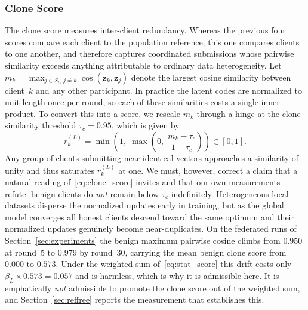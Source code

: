 \documentclass[journal]{IEEEtran}
\begin{document}
\subsubsection{Clone Score}
The clone score measures inter-client redundancy. Whereas the previous four scores compare each client to the population reference, this one compares clients to one another, and therefore captures coordinated submissions whose pairwise similarity exceeds anything attributable to ordinary data heterogeneity. Let $m_k = \max_{j \in S_t,\, j \neq k} \cos(\mathbf{z}_k, \mathbf{z}_j)$ denote the largest cosine similarity between client~$k$ and any other participant. In practice the latent codes are normalized to unit length once per round, so each of these similarities costs a single inner product. To convert this into a score, we rescale $m_k$ through a hinge at the clone-similarity threshold $\tau_c = 0.95$, which is given by
\begin{equation}
r_k^{(L)} = \min\!\left(1,\; \max\!\left(0,\; \frac{m_k - \tau_c}{1 - \tau_c}\right)\right) \in [0,1].
\label{eq:clone_score}
\end{equation}
Any group of clients submitting near-identical vectors approaches a similarity of unity and thus saturates $r_k^{(L)}$ at one. We must, however, correct a claim that a natural reading of~\eqref{eq:clone_score} invites and that our own measurements refute: benign clients do \emph{not} remain below $\tau_c$ indefinitely. Heterogeneous local datasets disperse the normalized updates early in training, but as the global model converges all honest clients descend toward the same optimum and their normalized updates genuinely become near-duplicates. On the federated runs of Section~\ref{sec:experiments} the benign maximum pairwise cosine climbs from $0.950$ at round~$5$ to $0.979$ by round~$30$, carrying the mean benign clone score from $0.000$ to $0.573$. Under the weighted sum of~\eqref{eq:stat_score} this drift costs only $\beta_L \times 0.573 = 0.057$ and is harmless, which is why it is admissible here. It is emphatically \emph{not} admissible to promote the clone score out of the weighted sum, and Section~\ref{sec:reffree} reports the measurement that establishes this.
\end{document}
